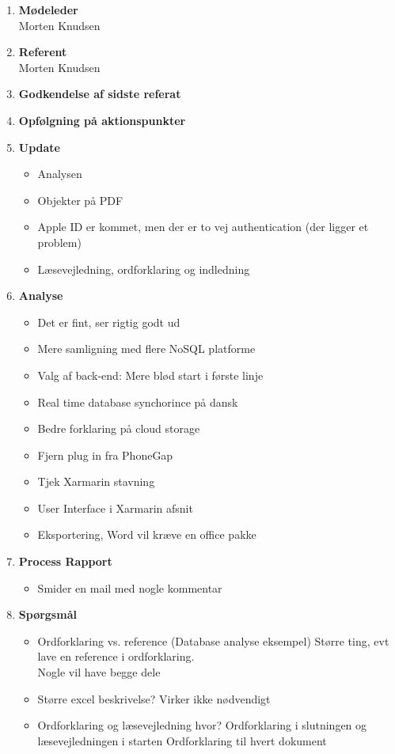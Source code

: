	\begin{enumerate}
		\itemsep 0.3em 
		\item \textbf{Mødeleder}\\
			Morten Knudsen
		\item \textbf{Referent}\\
			Morten Knudsen
		\item \textbf{Godkendelse af sidste referat}
			
		\item\textbf{Opfølgning på aktionspunkter}

		\item \textbf{Update}
			\begin{itemize}[-]
				\item Analysen
				\item Objekter på PDF
				\item Apple ID er kommet, men der er to vej authentication (der ligger et problem)
				\item Læsevejledning, ordforklaring og indledning
			\end{itemize}
	
		\item \textbf{Analyse}
		\begin{itemize}[-]
			\item Det er fint, ser rigtig godt ud
			\item Mere samligning med flere NoSQL platforme
			\item Valg af back-end: Mere blød start i første linje
			\item Real time database synchorince på dansk
			\item Bedre forklaring på cloud storage
			
			\item Fjern plug in fra PhoneGap
			\item Tjek Xarmarin stavning
			\item User Interface i Xarmarin afsnit
			
			\item Eksportering, Word vil kræve en office pakke
		\end{itemize}
	
			\item \textbf{Process Rapport}
		\begin{itemize}[-]
			\item Smider en mail med nogle kommentar
		\end{itemize}
	
		\item \textbf{Spørgsmål}
			\begin{itemize}[-]
				\item Ordforklaring vs. reference (Database analyse eksempel)
				Større ting, evt lave en reference i ordforklaring. \\
				Nogle vil have begge dele
				\item Større excel beskrivelse?
				Virker ikke nødvendigt
				\item Ordforklaring og læsevejledning hvor?
				Ordforklaring i slutningen og læsevejledningen i starten
				Ordforklaring til hvert dokument
			\end{itemize}
	

\end{enumerate}
